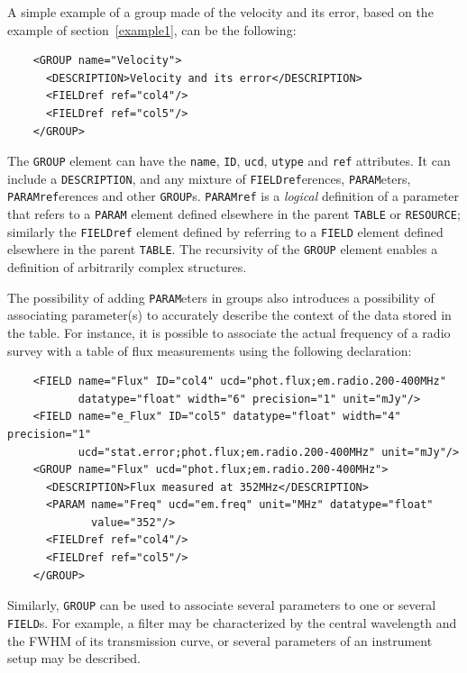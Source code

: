 \documentclass[11pt,a4paper]{ivoa}
\def\Aref#1{section~\ref{#1}}
\let\fg=\color
\def\attr#1{{\tt{\fg{DarkRed}#1}}}
\def\elem#1{{\tt{\fg{DarkRed}#1}}}
\begin{document}
A simple example of a group made of the velocity and its error,
based on the example of \Aref{example1},
can be the following:

\begingroup
\begin{verbatim}
    <GROUP name="Velocity">
      <DESCRIPTION>Velocity and its error</DESCRIPTION>
      <FIELDref ref="col4"/>
      <FIELDref ref="col5"/>
    </GROUP>
\end{verbatim}\endgroup


The \elem{GROUP} element can have the \attr{name}, \attr{ID}, \attr{ucd},
\attr{utype} and \attr{ref} attributes.
It can include a \elem{DESCRIPTION}, and any mixture of %
\elem{FIELDref}erences,
\elem{PARAM}eters, \elem{PARAMref}erences
and other \elem{GROUP}s. \elem{PARAMref} is a {\em logical} definition
of a parameter that refers to a \elem{PARAM}
element defined elsewhere in the parent \elem{TABLE} or \elem{RESOURCE};
similarly the \elem{FIELDref} element defined by referring
to a \elem{FIELD} element defined elsewhere in the parent \elem{TABLE}.
The recursivity of the \elem{GROUP} element enables a definition of
arbitrarily complex structures.

The possibility of adding \elem{PARAM}eters in groups also introduces
a possibility of associating parameter(s) to  accurately  describe
the context of the data stored in the table.
For instance,
it is possible to associate the actual frequency of a radio survey with
a table of flux measurements using
the following declaration:

\begin{verbatim}
    <FIELD name="Flux" ID="col4" ucd="phot.flux;em.radio.200-400MHz"
           datatype="float" width="6" precision="1" unit="mJy"/>
    <FIELD name="e_Flux" ID="col5" datatype="float" width="4" precision="1"
           ucd="stat.error;phot.flux;em.radio.200-400MHz" unit="mJy"/>
    <GROUP name="Flux" ucd="phot.flux;em.radio.200-400MHz">
      <DESCRIPTION>Flux measured at 352MHz</DESCRIPTION>
      <PARAM name="Freq" ucd="em.freq" unit="MHz" datatype="float"
             value="352"/>
      <FIELDref ref="col4"/>
      <FIELDref ref="col5"/>
    </GROUP>
\end{verbatim}

\par
Similarly, \elem{GROUP} can be used to associate several parameters
to one or several \elem{FIELD}s. For example, a filter may be
characterized by the central wavelength and the FWHM of its transmission
curve, or several parameters of an instrument setup may be described.
\end{document}
